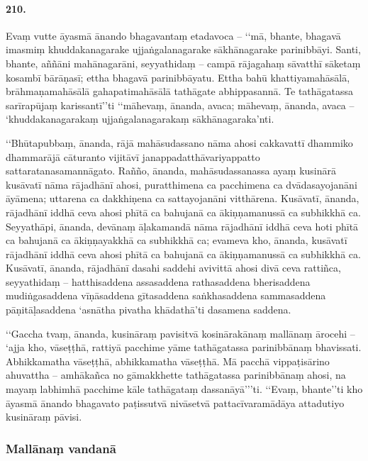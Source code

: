 \paragraph{210.} Evaṃ vutte āyasmā ānando bhagavantaṃ etadavoca – ‘‘mā, bhante, bhagavā imasmiṃ khuddakanagarake ujjaṅgalanagarake sākhānagarake parinibbāyi. Santi, bhante, aññāni mahānagarāni, seyyathidaṃ – campā rājagahaṃ sāvatthī sāketaṃ kosambī bārāṇasī; ettha bhagavā parinibbāyatu. Ettha bahū khattiyamahāsālā, brāhmaṇamahāsālā gahapatimahāsālā tathāgate abhippasannā. Te tathāgatassa sarīrapūjaṃ karissantī’’ti ‘‘māhevaṃ, ānanda, avaca; māhevaṃ, ānanda, avaca – ‘khuddakanagarakaṃ ujjaṅgalanagarakaṃ sākhānagaraka’nti.

‘‘Bhūtapubbaṃ, ānanda, rājā mahāsudassano nāma ahosi cakkavattī dhammiko dhammarājā cāturanto vijitāvī janappadatthāvariyappatto sattaratanasamannāgato. Rañño, ānanda, mahāsudassanassa ayaṃ kusinārā kusāvatī nāma rājadhānī ahosi, puratthimena ca pacchimena ca dvādasayojanāni āyāmena; uttarena ca dakkhiṇena ca sattayojanāni vitthārena. Kusāvatī, ānanda, rājadhānī iddhā ceva ahosi phītā ca bahujanā ca ākiṇṇamanussā ca subhikkhā ca. Seyyathāpi, ānanda, devānaṃ āḷakamandā nāma rājadhānī iddhā ceva hoti phītā ca bahujanā ca ākiṇṇayakkhā ca subhikkhā ca; evameva kho, ānanda, kusāvatī rājadhānī iddhā ceva ahosi phītā ca bahujanā ca ākiṇṇamanussā ca subhikkhā ca. Kusāvatī, ānanda, rājadhānī dasahi saddehi avivittā ahosi divā ceva rattiñca, seyyathidaṃ – hatthisaddena assasaddena rathasaddena bherisaddena mudiṅgasaddena vīṇāsaddena gītasaddena saṅkhasaddena sammasaddena pāṇitāḷasaddena ‘asnātha pivatha khādathā’ti dasamena saddena.

‘‘Gaccha tvaṃ, ānanda, kusināraṃ pavisitvā kosinārakānaṃ mallānaṃ ārocehi – ‘ajja kho, vāseṭṭhā, rattiyā pacchime yāme tathāgatassa parinibbānaṃ bhavissati. Abhikkamatha vāseṭṭhā, abhikkamatha vāseṭṭhā. Mā pacchā vippaṭisārino ahuvattha – amhākañca no gāmakkhette tathāgatassa parinibbānaṃ ahosi, na mayaṃ labhimhā pacchime kāle tathāgataṃ dassanāyā’’’ti. ‘‘Evaṃ, bhante’’ti kho āyasmā ānando bhagavato paṭissutvā nivāsetvā pattacīvaramādāya attadutiyo kusināraṃ pāvisi.

\subsubsection{Mallānaṃ vandanā}

